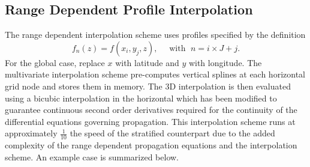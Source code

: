 \documentclass[10pt]{article}
\begin{document}
\subsection{Range Dependent Profile Interpolation}
 \label{Sect:Clarifications:RngDep}

\hspace{0.25in} The range dependent interpolation scheme uses profiles specified by the definition
\begin{equation*}
 f_n \left( z \right) = f \left( x_i, y_j, z \right), \quad \text{ with } \; n = i \times J + j.
 \end{equation*}
For the global case, replace \(x\) with latitude and \(y\) with longitude.  The multivariate interpolation scheme pre-computes vertical splines at each horizontal grid node and stores them in memory.  The 3D interpolation is then evaluated using a bicubic interpolation in the horizontal which has been modified to guarantee continuous second order derivatives required for the continuity of the differential equations governing propagation.  This interpolation scheme runs at approximately \(\frac{1}{10}\) the speed of the stratified counterpart due to the added complexity of the range dependent propagation equations and the interpolation scheme.  An example case is summarized below.
\end{document}
